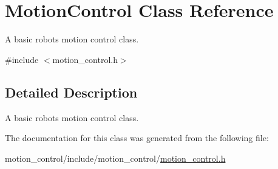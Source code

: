 \hypertarget{classMotionControl}{}\section{Motion\+Control Class Reference}
\label{classMotionControl}


A basic robot\textquotesingle{}s motion control class.  




{\ttfamily \#include $<$motion\+\_\+control.\+h$>$}



\subsection{Detailed Description}
A basic robot\textquotesingle{}s motion control class. 

The documentation for this class was generated from the following file\+:\begin{DoxyCompactItemize}
\item 
motion\+\_\+control/include/motion\+\_\+control/\hyperlink{motion__control_8h}{motion\+\_\+control.\+h}\end{DoxyCompactItemize}

